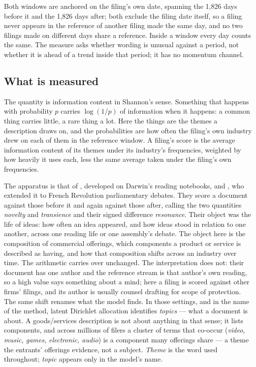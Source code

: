 Both windows are anchored on the filing's own date, spanning the 1,826
days before it
and the 1,826 days after; both exclude the filing date itself, so a filing
never appears in the reference of another filing made the same day, and no
two filings made on different days share a reference. Inside a window every day counts the same. The measure asks whether
wording is unusual against a period, not whether it is ahead of a trend
inside that period; it has no momentum channel.

\subsection{What is measured}

The quantity is information content in Shannon's sense. Something that
happens with probability $p$ carries $\log(1/p)$ of information when it
happens: a common thing carries little, a rare thing a lot. Here the things
are the themes a description draws on, and the probabilities are how often
the filing's own industry drew on each of them in the reference window. A
filing's score is the average information content of its themes under its
industry's frequencies, weighted by how heavily it uses each, less the same
average taken under the filing's own frequencies.

The apparatus is that of \citet{Murdock2017}, developed on Darwin's reading
notebooks, and \citet{Barron2018}, who extended it to French Revolution
parliamentary debates. They score a document against those before it and
again against those after, calling the two quantities \emph{novelty} and
\emph{transience} and their signed difference \emph{resonance}. Their object
was the life of ideas: how often an idea appeared, and how ideas stood in
relation to one another, across one reading life or one assembly's debate.
The object here is the composition of commercial offerings, which components
a product or service is described as having, and how that composition shifts
across an industry over time. The arithmetic carries over unchanged. The
interpretation does not: their document has one author and the reference
stream is that author's own reading, so a high value says something about a
mind; here a filing is scored against other firms' filings, and its author is
usually counsel drafting for scope of protection. The same shift renames
what the model finds. In those settings, and in the name of the method,
latent Dirichlet allocation identifies \emph{topics} --- what a document
is about. A goods/services description is not about anything in that
sense; it lists components, and across millions of filers a cluster of
terms that co-occur (\emph{video, music, games, electronic, audio}) is a
component many offerings share --- a theme the entrants' offerings
evidence, not a subject. \emph{Theme} is the word used throughout;
\emph{topic} appears only in the model's name.

